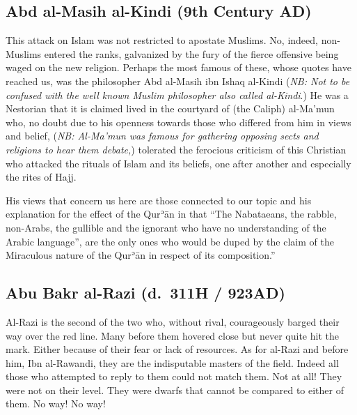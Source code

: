 \documentclass[12pt]{book}
\def \Quran{Qurʾān} %
\def \Qrn{\Quran}   %
\newcommand{\NB}[1]{\emph{NB: #1}}
\begin{document}


\subsection{Abd al-Masih al-Kindi (9th Century AD)}

This attack on Islam was not restricted to apostate Muslims. No, indeed,
non-Muslims entered the ranks, galvanized by the fury of the fierce offensive
being waged on the new religion. Perhaps the most famous of these, whose quotes
have reached us, was the philosopher Abd al-Masih ibn Ishaq al-Kindi
(\NB{Not to be confused with the well known Muslim philosopher also called
al-Kindi}.)
He was a Nestorian that it is claimed lived in the courtyard of (the Caliph)
al-Ma’mun who, no doubt due to his openness towards those who differed from him
in views and belief,
(\NB{Al-Ma’mun was famous for gathering opposing sects and religions to hear
them debate,})
tolerated the ferocious criticism of this
Christian who attacked the rituals of Islam and its beliefs, one after another
and especially the rites of Hajj.

His views that concern us here are those connected to our topic and his
explanation for the effect of the \Qrn{} in that “The Nabataeans, the rabble,
non-Arabs, the gullible and the ignorant who have no understanding of the
Arabic language”, are the only ones who would be duped by the claim of the
Miraculous nature of the \Qrn{} in respect of its composition.”\footnotemark



\subsection{Abu Bakr al-Razi (d.\ 311H / 923AD)}

Al-Razi is the second of the two who, without rival,
courageously barged their way over the red line.
Many before them hovered close but never quite hit the mark.
Either because of their fear or lack of resources.
As for al-Razi and before him, Ibn al-Rawandi, they are the indisputable
masters of the field.
Indeed all those who attempted to reply to them could not match them.
Not at all! They were not on their level.
They were dwarfs that cannot be compared to either of them.
No way! No way!
\end{document}
